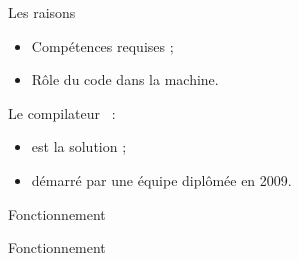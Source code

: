 \documentclass{beamer}
\begin{document}
\begin{frame}{Les raisons}
\LARGE{
\begin{itemize}
\item Compétences requises ;
\item Rôle du code dans la machine.
\end{itemize}
}
\end{frame}

\begin{frame}{\rtx}
\LARGE{Le compilateur \rtx\ :}
\Large{
\vspace{1em}
\begin{itemize}
\item est la solution ;
\item démarré par une équipe diplômée en 2009.
\end{itemize}
}
\end{frame}

\begin{frame}[fragile]{Fonctionnement}
\end{frame}

\begin{frame}[fragile]{Fonctionnement}
\end{frame}
\end{document}
